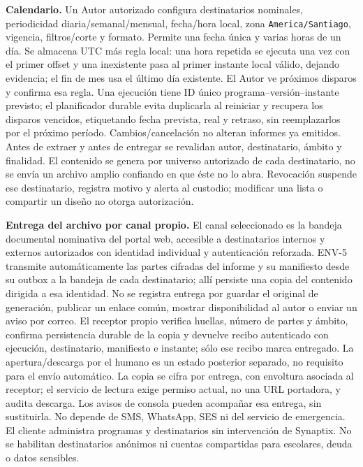 \textbf{Calendario.} Un Autor autorizado configura destinatarios nominales, periodicidad diaria/semanal/mensual, fecha/hora local, zona \texttt{America/Santiago}, vigencia, filtros/corte y formato. Permite una fecha única y varias horas de un día. Se almacena UTC más regla local: una hora repetida se ejecuta una vez con el primer offset y una inexistente pasa al primer instante local válido, dejando evidencia; el fin de mes usa el último día existente. El Autor ve próximos disparos y confirma esa regla. Una ejecución tiene ID único programa--versión--instante previsto; el planificador durable evita duplicarla al reiniciar y recupera los disparos vencidos, etiquetando fecha prevista, real y retraso, sin reemplazarlos por el próximo período. Cambios/cancelación no alteran informes ya emitidos. Antes de extraer y antes de entregar se revalidan autor, destinatario, ámbito y finalidad. El contenido se genera por universo autorizado de cada destinatario, no se envía un archivo amplio confiando en que éste no lo abra. Revocación suspende ese destinatario, registra motivo y alerta al custodio; modificar una lista o compartir un diseño no otorga autorización.

\textbf{Entrega del archivo por canal propio.} El canal seleccionado es la bandeja documental nominativa del portal web, accesible a destinatarios internos y externos autorizados con identidad individual y autenticación reforzada. ENV-5 transmite automáticamente las partes cifradas del informe y su manifiesto desde su outbox a la bandeja de cada destinatario; allí persiste una copia del contenido dirigida a esa identidad. No se registra entrega por guardar el original de generación, publicar un enlace común, mostrar disponibilidad al autor o enviar un aviso por correo. El receptor propio verifica huellas, número de partes y ámbito, confirma persistencia durable de la copia y devuelve recibo autenticado con ejecución, destinatario, manifiesto e instante; sólo ese recibo marca entregado. La apertura/descarga por el humano es un estado posterior separado, no requisito para el envío automático. La copia se cifra por entrega, con envoltura asociada al receptor; el servicio de lectura exige permiso actual, no una URL portadora, y audita descarga. Los avisos de consola pueden acompañar esa entrega, sin sustituirla. No depende de SMS, WhatsApp, SES ni del servicio de emergencia. El cliente administra programas y destinatarios sin intervención de Synaptix. No se habilitan destinatarios anónimos ni cuentas compartidas para escolares, deuda o datos sensibles.

